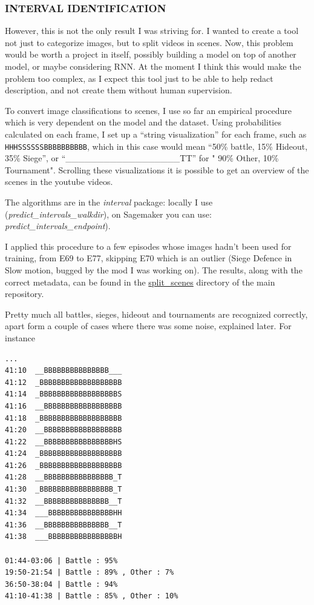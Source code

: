 \documentclass[
]{article}
\begin{document}
\hypertarget{interval-identification}{%
	\subsubsection{INTERVAL IDENTIFICATION}\label{interval-identification}}

However, this is not the only result I was striving for. I wanted to
create a tool not just to categorize images, but to split videos in
scenes. Now, this problem would be worth a project in itself, possibly
building a model on top of another model, or maybe considering RNN. At
the moment I think this would make the problem too complex, as I expect
this tool just to be able to help redact description, and not create
them without human supervision.

To convert image classifications to scenes, I use so far an empirical
procedure which is very dependent on the model and the dataset. Using
probabilities calculated on each frame, I set up a ``string
visualization'' for each frame, such as \texttt{HHHSSSSSSBBBBBBBBBB},
which in this case would mean ``50\% battle, 15\% Hideout, 35\% Siege'',
or ``\_\_\_\_\_\_\_\_\_\_\_\_\_\_\_\_\_\_TT'' for " 90\% Other, 10\%
Tournament". Scrolling these visualizations it is possible to get an
overview of the scenes in the youtube videos.

The algorithms are in the \emph{interval} package: locally I use
(\emph{predict\_intervals\_walkdir}), on Sagemaker you can use:
\emph{predict\_intervals\_endpoint}).

I applied this procedure to a few episodes whose images hadn't been used
for training, from E69 to E77, skipping E70 which is an outlier (Siege
Defence in Slow motion, bugged by the mod I was working on). The
results, along with the correct metadata, can be found in the
\url{split_scenes} directory of the main repository.

Pretty much all battles, sieges, hideout and tournaments are recognized
correctly, apart form a couple of cases where there was some noise,
explained later. For instance

\begin{verbatim}
...
41:10  __BBBBBBBBBBBBBBB___
41:12  _BBBBBBBBBBBBBBBBBBB
41:14  _BBBBBBBBBBBBBBBBBBS
41:16  __BBBBBBBBBBBBBBBBBB
41:18  _BBBBBBBBBBBBBBBBBBB
41:20  __BBBBBBBBBBBBBBBBBB
41:22  __BBBBBBBBBBBBBBBBHS
41:24  _BBBBBBBBBBBBBBBBBBB
41:26  _BBBBBBBBBBBBBBBBBBB
41:28  __BBBBBBBBBBBBBBBB_T
41:30  _BBBBBBBBBBBBBBBBB_T
41:32  __BBBBBBBBBBBBBBB__T
41:34  ___BBBBBBBBBBBBBBBHH
41:36  __BBBBBBBBBBBBBBB__T
41:38  ___BBBBBBBBBBBBBBBBH

01:44-03:06 | Battle : 95%
19:50-21:54 | Battle : 89% , Other : 7%
36:50-38:04 | Battle : 94%
41:10-41:38 | Battle : 85% , Other : 10% 
\end{verbatim}
\end{document}
